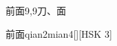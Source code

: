 \begin{entry}{前面}{9,9}{⼑、⾯}
  \begin{phonetics}{前面}{qian2mian4}[][HSK 3]
  \end{phonetics}
\end{entry}
